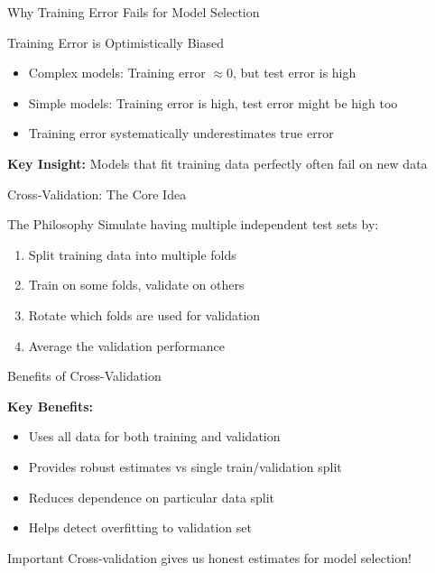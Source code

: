 \documentclass[aspectratio=169,10pt]{beamer}
\begin{document}
\begin{frame}{Why Training Error Fails for Model Selection}
\begin{examplebox}{Training Error is Optimistically Biased}
\begin{itemize}
\item Complex models: Training error $\approx 0$, but test error is high
\item Simple models: Training error is high, test error might be high too
\item Training error systematically underestimates true error
\end{itemize}
\end{examplebox}

\begin{keypointsbox}
\textbf{Key Insight:} Models that fit training data perfectly often fail on new data
\end{keypointsbox}
\end{frame}

\begin{frame}{Cross-Validation: The Core Idea}
\begin{definitionbox}{The Philosophy}
Simulate having multiple independent test sets by:
\begin{enumerate}
\item Split training data into multiple folds
\item Train on some folds, validate on others
\item Rotate which folds are used for validation
\item Average the validation performance
\end{enumerate}
\end{definitionbox}
\end{frame}

\begin{frame}{Benefits of Cross-Validation}
\begin{keypointsbox}
\textbf{Key Benefits:}
\begin{itemize}
\item Uses all data for both training and validation
\item Provides robust estimates vs single train/validation split
\item Reduces dependence on particular data split
\item Helps detect overfitting to validation set
\end{itemize}
\end{keypointsbox}

\begin{alertbox}{Important}
Cross-validation gives us honest estimates for model selection!
\end{alertbox}
\end{frame}
\end{document}
